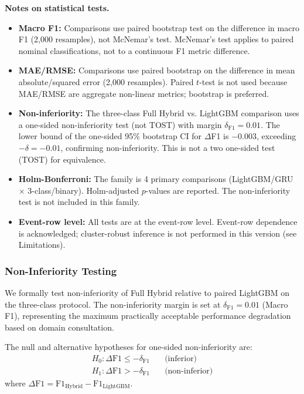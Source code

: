 \documentclass[runningheads]{llncs}
\begin{document}
\textbf{Notes on statistical tests.}
\begin{itemize}
\item \textbf{Macro F1:} Comparisons use paired bootstrap test on the difference in macro F1 (2,000 resamples), not McNemar's test. McNemar's test applies to paired nominal classifications, not to a continuous F1 metric difference.
\item \textbf{MAE/RMSE:} Comparisons use paired bootstrap on the difference in mean absolute/squared error (2,000 resamples). Paired $t$-test is not used because MAE/RMSE are aggregate non-linear metrics; bootstrap is preferred.
\item \textbf{Non-inferiority:} The three-class Full Hybrid vs. LightGBM comparison uses a one-sided non-inferiority test (not TOST) with margin $\delta_{\text{F1}}=0.01$. The lower bound of the one-sided 95\% bootstrap CI for $\Delta$F1 is $-0.003$, exceeding $-\delta = -0.01$, confirming non-inferiority. This is not a two one-sided test (TOST) for equivalence.
\item \textbf{Holm-Bonferroni:} The family is 4 primary comparisons (LightGBM/GRU $\times$ 3-class/binary). Holm-adjusted $p$-values are reported. The non-inferiority test is not included in this family.
\item \textbf{Event-row level:} All tests are at the event-row level. Event-row dependence is acknowledged; cluster-robust inference is not performed in this version (see Limitations).
\end{itemize}

\subsubsection{Non-Inferiority Testing}
\label{secni-testing}

We formally test non-inferiority of Full Hybrid relative to paired LightGBM on the three-class protocol. The non-inferiority margin is set at $\delta_{\text{F1}} = 0.01$ (Macro F1), representing the maximum practically acceptable performance degradation based on domain consultation.

The null and alternative hypotheses for one-sided non-inferiority are:
\begin{align}
H_0: \Delta \text{F1} \leq -\delta_{\text{F1}} \quad &\text{(inferior)} \\
H_1: \Delta \text{F1} > -\delta_{\text{F1}} \quad &\text{(non-inferior)}
\end{align}
where $\Delta \text{F1} = \text{F1}_{\text{Hybrid}} - \text{F1}_{\text{LightGBM}}$.
\end{document}
